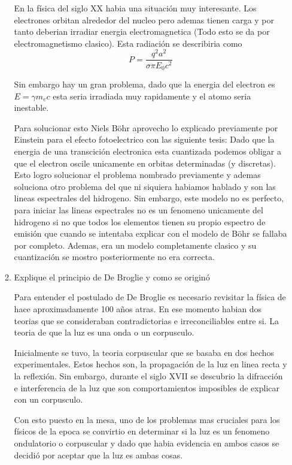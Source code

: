 \documentclass[12pt]{exam}
\begin{document}
\begin{enumerate}
\begin{enumerate}
				En la física del siglo XX habia una situación muy interesante. Los electrones orbitan alrededor del nucleo pero ademas tienen carga y por tanto deberian irradiar energia electromagnetica (Todo esto se da por electromagnetismo clasico). Esta radiación se describiria como $$P=\frac{q^2a^2}{\sigma\pi E_0c^2}$$ 

				Sin embargo hay un gran problema, dado que la energia del electron es $E = \gamma m_e c$ esta seria irradiada muy rapidamente y el atomo seria inestable.

				Para solucionar esto Niels B\"{o}hr aprovecho lo explicado previamente por Einstein para el efecto fotoelectrico con las siguiente tesis: Dado que la energia de una transcición electronica esta cuantizada podemos obligar a que el electron oscile unicamente en orbitas determinadas (y discretas). Esto logro solucionar el problema nombrado previamente y ademas soluciona otro problema del que ni siquiera habiamos hablado y son las lineas espectrales del hidrogeno. Sin embargo, este modelo no es perfecto, para iniciar las lineas espectrales no es un fenomeno unicamente del hidrogeno si no que todos los elementos tienen su propio espectro de emisión que cuando se intentaba explicar con el modelo de B\"{o}hr se fallaba por completo. Ademas, era un modelo completamente clasico y su cuantización se mostro posteriormente no era correcta.\cite{Notas1}
			\item Explique el principio de De Broglie y como se originó

        Para entender el  postulado de De Broglie es necesario revisitar la física de hace aproximadamente 100 años atras. 
        En ese momento habian dos teorias que se consideraban contradictorias e irreconciliables entre si. La teoria de que la luz es 
        una onda o un corpusculo. 

        Inicialmente se tuvo, la teoria corpuscular que se basaba en dos hechos experimentales. Estos hechos son, la propagación de la luz
        en linea recta y la reflexión. Sin embargo, durante el siglo XVII se descubrio la difracción e interferencia de la luz que son comportamientos
        imposibles de explicar con un corpusculo. 
				
        Con esto puesto en la mesa, uno de los problemas mas cruciales para los físicos de la epoca se convirtio en determinar si 
        la luz es un fenomeno ondulatorio o corpuscular y dado que habia evidencia en ambos casos se decidió por aceptar que la luz
        es ambas cosas. 


\end{enumerate}
\end{enumerate}
\end{document}
